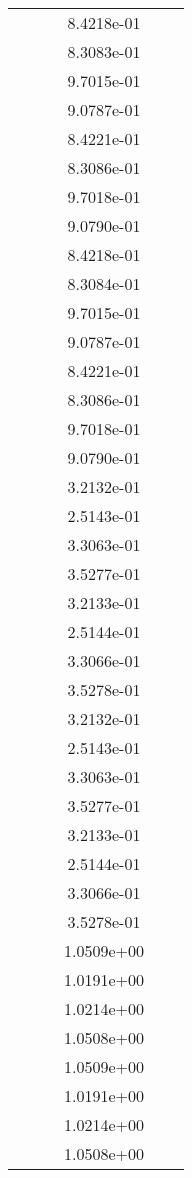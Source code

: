 \begin{xltabular}{\textwidth}{r|rS[table-format=1.3e+2]S[table-format=1.4e+2]S[table-format=1.4e+2]S[table-format=-1.5]}
&  &  & 8.4218e-01 & & \\
&  &  & 8.3083e-01 & & \\
&  &  & 9.7015e-01 & & \\
&  &  & 9.0787e-01 & & \\
&  &  & 8.4221e-01 & & \\
&  &  & 8.3086e-01 & & \\
&  &  & 9.7018e-01 & & \\
&  &  & 9.0790e-01 & & \\
&  &  & 8.4218e-01 & & \\
&  &  & 8.3084e-01 & & \\
&  &  & 9.7015e-01 & & \\
&  &  & 9.0787e-01 & & \\
&  &  & 8.4221e-01 & & \\
&  &  & 8.3086e-01 & & \\
&  &  & 9.7018e-01 & & \\
&  &  & 9.0790e-01 & & \\
&  &  & 3.2132e-01 & & \\
&  &  & 2.5143e-01 & & \\
&  &  & 3.3063e-01 & & \\
&  &  & 3.5277e-01 & & \\
&  &  & 3.2133e-01 & & \\
&  &  & 2.5144e-01 & & \\
&  &  & 3.3066e-01 & & \\
&  &  & 3.5278e-01 & & \\
&  &  & 3.2132e-01 & & \\
&  &  & 2.5143e-01 & & \\
&  &  & 3.3063e-01 & & \\
&  &  & 3.5277e-01 & & \\
&  &  & 3.2133e-01 & & \\
&  &  & 2.5144e-01 & & \\
&  &  & 3.3066e-01 & & \\
&  &  & 3.5278e-01 & & \\
&  &  & 1.0509e+00 & & \\
&  &  & 1.0191e+00 & & \\
&  &  & 1.0214e+00 & & \\
&  &  & 1.0508e+00 & & \\
&  &  & 1.0509e+00 & & \\
&  &  & 1.0191e+00 & & \\
&  &  & 1.0214e+00 & & \\
&  &  & 1.0508e+00 & & \\

\end{xltabular}
